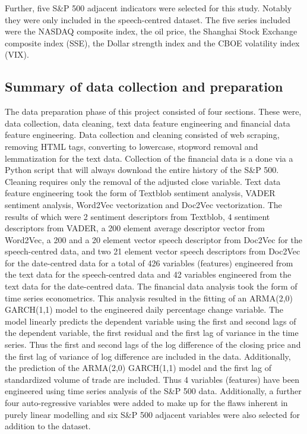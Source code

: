 \documentclass[11pt,preprint, authoryear]{elsarticle}
\numberwithin{equation}{section}
\numberwithin{figure}{section}
\numberwithin{table}{section}
\begin{document}
Further, five S\&P 500 adjacent indicators were selected for this study.
Notably they were only included in the speech-centred dataset. The five
series included were the NASDAQ composite index, the oil price, the
Shanghai Stock Exchange composite index (SSE), the Dollar strength index
and the CBOE volatility index (VIX).

\hypertarget{summary-of-data-collection-and-preparation}{%
\subsection{Summary of data collection and
preparation}\label{summary-of-data-collection-and-preparation}}

The data preparation phase of this project consisted of four sections.
These were, data collection, data cleaning, text data feature
engineering and financial data feature engineering. Data collection and
cleaning consisted of web scraping, removing HTML tags, converting to
lowercase, stopword removal and lemmatization for the text data.
Collection of the financial data is a done via a Python script that will
always download the entire history of the S\&P 500. Cleaning requires
only the removal of the adjusted close variable. Text data feature
engineering took the form of Textblob sentiment analysis, VADER
sentiment analysis, Word2Vec vectorization and Doc2Vec vectorization.
The results of which were 2 sentiment descriptors from Textblob, 4
sentiment descriptors from VADER, a 200 element average descriptor
vector from Word2Vec, a 200 and a 20 element vector speech descriptor
from Doc2Vec for the speech-centred data, and two 21 element vector
speech descriptors from Doc2Vec for the date-centred data for a total of
426 variables (features) engineered from the text data for the
speech-centred data and 42 variables engineered from the text data for
the date-centred data. The financial data analysis took the form of time
series econometrics. This analysis resulted in the fitting of an
ARMA(2,0) GARCH(1,1) model to the engineered daily percentage change
variable. The model linearly predicts the dependent variable using the
first and second lags of the dependent variable, the first residual and
the first lag of variance in the time series. Thus the first and second
lags of the log difference of the closing price and the first lag of
variance of log difference are included in the data. Additionally, the
prediction of the ARMA(2,0) GARCH(1,1) model and the first lag of
standardized volume of trade are included. Thus 4 variables (features)
have been engineered using time series analysis of the S\&P 500 data.
Additionally, a further four auto-regressive variables were added to
make up for the flaws inherent in purely linear modelling and six S\&P
500 adjacent variables were also selected for addition to the dataset.
\end{document}
